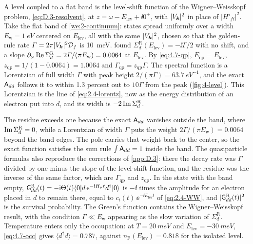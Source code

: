 \begin{workedexample}{A level coupled to a flat band}
 is the level-shift function of the Wigner--Weisskopf problem, \cref{eq:D.3-resolvent}, at $z = \omega - E_{\mathrm{lev}} + \ii0^+$, with $|V_{\bm{k}}|^2$ in place of $|H'_{fi}|^2$. Take the flat band of \cref{we:2-continuum}: states spread uniformly over a width $E_{\mathrm{w}} = \SI{1}{eV}$ centered on $E_{\mathrm{lev}}$, all with the same $|V_{\bm{k}}|^2$, chosen so that the golden-rule rate $\varGamma = 2\pi|V_{\bm{k}}|^2\mathcal{D}_f$ is \SI{10}{meV}.  found $\Sigma^{\mathrm{R}}_d(E_{\mathrm{lev}}) = -\ii\varGamma/2$ with no shift, and a slope $\partial_\omega\operatorname{Re}\Sigma^{\mathrm{R}}_d = 2\varGamma/(\pi E_{\mathrm{w}}) = 0.0064$ at $E_{\mathrm{lev}}$. By \cref{eq:4.7-qp}, $E_{\mathrm{qp}} = E_{\mathrm{lev}}$, $z_{\mathrm{qp}} = 1/(1 - 0.0064) = 1.0064$ and $\varGamma_{\mathrm{qp}} = z_{\mathrm{qp}}\varGamma$. The spectral function is a Lorentzian of full width $\varGamma$ with peak height $2/(\pi\varGamma) = \SI{63.7}{eV^{-1}}$, and the exact $\mathsf{A}_{dd}$ follows it to within 1.3 percent out to $10\varGamma$ from the peak (\cref{fig:4-level}). This Lorentzian is the line of \cref{eq:2.4-lorentz}, now as the energy distribution of an electron put into $d$, and its width is $-2\operatorname{Im}\Sigma^{\mathrm{R}}_d$.

The residue exceeds one because the exact $\mathsf{A}_{dd}$ vanishes outside the band, where $\operatorname{Im}\Sigma^{\mathrm{R}}_d = 0$, while a Lorentzian of width $\varGamma$ puts the weight $2\varGamma/(\pi E_{\mathrm{w}}) = 0.0064$ beyond the band edges. The pole carries that weight back to the center, so the exact function satisfies the sum rule $\int\mathsf{A}_{dd} = 1$ inside the band. The quasiparticle formulas also reproduce the corrections of \cref{app:D.3}: there the decay rate was $\varGamma$ divided by one minus the slope of the level-shift function, and the residue was the inverse of the same factor, which are $\varGamma_{\mathrm{qp}}$ and $z_{\mathrm{qp}}$. In the state with the band empty, $\mathsf{G}^{\mathrm{R}}_{dd}(t) = -\mathrm{i}\Theta(t)\langle0|d\,\mathrm{e}^{-\mathrm{i} H_\mu t}d^\dagger|0\rangle$ is $-\ii$ times the amplitude for an electron placed in $d$ to remain there, equal to $c_i(t)\,\ee^{-\ii E_{\mathrm{lev}}t}$ of \cref{eq:2.4-WW}, and $|\mathsf{G}^{\mathrm{R}}_{dd}(t)|^2$ is the survival probability. The Green's function contains the Wigner--Weisskopf result, with the condition $\varGamma \ll E_{\mathrm{w}}$ appearing as the slow variation of $\Sigma^{\mathrm{R}}_d$. Temperature enters only the occupation: at $T = \SI{20}{meV}$ and $E_{\mathrm{lev}} = \SI{-30}{meV}$, \cref{eq:4.7-occ} gives $\langle d^\dagger d\rangle = 0.787$, against $n_{\mathrm{F}}(E_{\mathrm{lev}}) = 0.818$ for the isolated level.
\end{workedexample}

